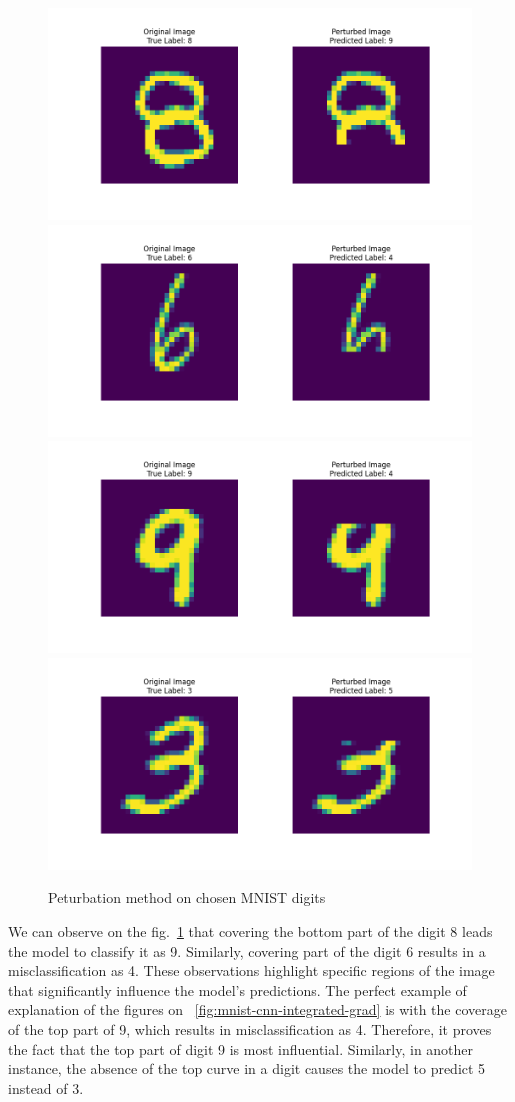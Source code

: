 \documentclass[journal, a4paper]{IEEEtran}
\begin{document}
\begin{figure}[ht]\centering
    \includegraphics[width=.6\linewidth]{img/counterfacts/MNIST/cover_bottom/img_1}
    \includegraphics[width=.6\linewidth]{img/counterfacts/MNIST/cover_bottom/img_3}
    \includegraphics[width=.6\linewidth]{img/counterfacts/MNIST/cover_top/img_10}
    \includegraphics[width=.6\linewidth]{img/counterfacts/MNIST/cover_top/img_3}
    \caption{Peturbation method on chosen MNIST digits}\label{fig:mnist-cnn-counterfacts}
\end{figure}

We can observe on the fig.~\ref{fig:mnist-cnn-counterfacts} that covering the bottom part of the digit 8 leads the model to classify it as 9.
Similarly, covering part of the digit 6 results in a misclassification as 4.
These observations highlight specific regions of the image that significantly influence the model's predictions.
The perfect example of explanation of the figures on ~\ref{fig:mnist-cnn-integrated-grad} is with the coverage of the top part of 9, which results in misclassification as 4.
Therefore, it proves the fact that the top part of digit 9 is most influential.
Similarly, in another instance, the absence of the top curve in a digit causes the model to predict 5 instead of 3.
\end{document}
